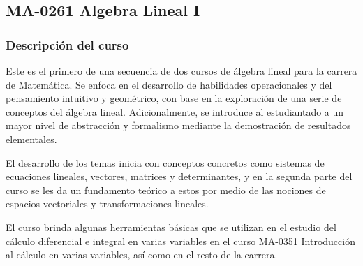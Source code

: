 \newpage
\subsection*{MA-0261 Algebra Lineal I}

\begin{refsection}
\begin{table}[H]
\end{table}



\subsubsection*{Descripción del curso}

Este es el primero de una secuencia de dos cursos de álgebra lineal para la carrera de Matemática. Se enfoca en el desarrollo de habilidades operacionales y del pensamiento intuitivo y geométrico, con base en la exploración de una serie de conceptos del álgebra lineal. Adicionalmente, se introduce al estudiantado a un mayor nivel de abstracción y formalismo mediante la demostración de resultados elementales. 

El desarrollo de los temas inicia con conceptos concretos como sistemas de ecuaciones lineales, vectores, matrices y determinantes, y en la segunda parte del curso se les da un fundamento teórico a estos por medio de las nociones de espacios vectoriales y transformaciones lineales.

El curso brinda algunas herramientas básicas que se utilizan en el estudio del cálculo diferencial e integral en varias variables en el curso MA-0351 Introducción al cálculo en varias variables, así como en el resto de la carrera.


\end{refsection}
